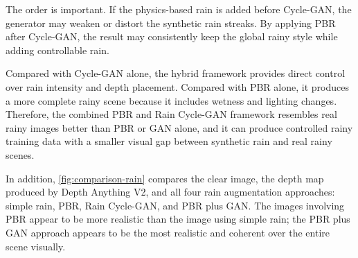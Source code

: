 \documentclass[10pt,letterpaper]{article}
\begin{document}
The order is important. If the physics-based rain is added before Cycle-GAN, the generator may weaken or distort the synthetic rain streaks.
By applying PBR after Cycle-GAN, the result may consistently keep the global rainy style while adding controllable rain.

Compared with Cycle-GAN alone, the hybrid framework provides direct control over rain intensity and depth placement. Compared with PBR alone, 
it produces a more complete rainy scene because it includes wetness and lighting changes. Therefore, the combined PBR and Rain Cycle-GAN framework
resembles real rainy images better than PBR or GAN alone, and it can produce controlled rainy training data with a smaller visual gap between synthetic rain and real rainy scenes.

In addition, \autoref{fig:comparison-rain} compares the clear image, the depth map produced by Depth Anything V2, and all four rain augmentation approaches: simple rain, PBR, Rain Cycle-GAN, and PBR plus GAN. 
The images involving PBR appear to be more realistic than the image using simple rain; the PBR plus GAN approach appears to be the most realistic and coherent over the entire scene visually.
\end{document}
